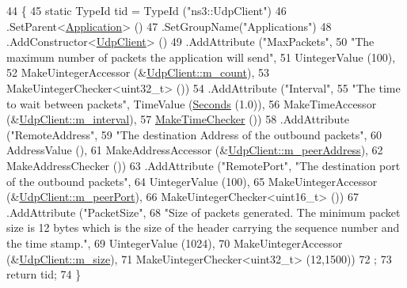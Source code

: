 \begin{DoxyCode}
44 \{
45   \textcolor{keyword}{static} TypeId tid = TypeId (\textcolor{stringliteral}{"ns3::UdpClient"})
46     .SetParent<\hyperlink{classns3_1_1Application_acd261926c72b02cdb48fc7f8838ee173}{Application}> ()
47     .SetGroupName(\textcolor{stringliteral}{"Applications"})
48     .AddConstructor<\hyperlink{classns3_1_1UdpClient_aa2cc06671e4e3928a489f02ddf9f1408}{UdpClient}> ()
49     .AddAttribute (\textcolor{stringliteral}{"MaxPackets"},
50                    \textcolor{stringliteral}{"The maximum number of packets the application will send"},
51                    UintegerValue (100),
52                    MakeUintegerAccessor (&\hyperlink{classns3_1_1UdpClient_aa42e5fec49376e6a5de8a8d6fecb3654}{UdpClient::m\_count}),
53                    MakeUintegerChecker<uint32\_t> ())
54     .AddAttribute (\textcolor{stringliteral}{"Interval"},
55                    \textcolor{stringliteral}{"The time to wait between packets"}, TimeValue (\hyperlink{group__timecivil_ga33c34b816f8ff6628e33d5c8e9713b9e}{Seconds} (1.0)),
56                    MakeTimeAccessor (&\hyperlink{classns3_1_1UdpClient_a10be8f529aed10334cfb1239b231b7a0}{UdpClient::m\_interval}),
57                    \hyperlink{group__time_ga7032965bd4afa578691d88c09e4481c1}{MakeTimeChecker} ())
58     .AddAttribute (\textcolor{stringliteral}{"RemoteAddress"},
59                    \textcolor{stringliteral}{"The destination Address of the outbound packets"},
60                    AddressValue (),
61                    MakeAddressAccessor (&\hyperlink{classns3_1_1UdpClient_abda566e33a7381c7ce53e7f9aae39013}{UdpClient::m\_peerAddress}),
62                    MakeAddressChecker ())
63     .AddAttribute (\textcolor{stringliteral}{"RemotePort"}, \textcolor{stringliteral}{"The destination port of the outbound packets"},
64                    UintegerValue (100),
65                    MakeUintegerAccessor (&\hyperlink{classns3_1_1UdpClient_a76a73f60bb2454a6838a5f2315dd2842}{UdpClient::m\_peerPort}),
66                    MakeUintegerChecker<uint16\_t> ())
67     .AddAttribute (\textcolor{stringliteral}{"PacketSize"},
68                    \textcolor{stringliteral}{"Size of packets generated. The minimum packet size is 12 bytes which is the size of the
       header carrying the sequence number and the time stamp."},
69                    UintegerValue (1024),
70                    MakeUintegerAccessor (&\hyperlink{classns3_1_1UdpClient_aa3adbd7e4fc1590d0b99c225a083abb9}{UdpClient::m\_size}),
71                    MakeUintegerChecker<uint32\_t> (12,1500))
72   ;
73   \textcolor{keywordflow}{return} tid;
74 \}
\end{DoxyCode}


